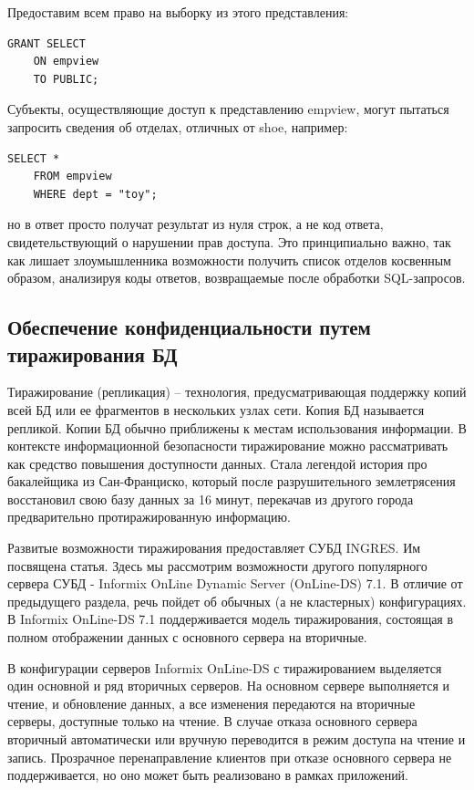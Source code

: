 Предоставим всем право на выборку из этого представления:
\begin{lstlisting}[]
    GRANT SELECT
    ON empview
    TO PUBLIC;
\end{lstlisting}

Субъекты, осуществляющие доступ к представлению empview, могут пытаться запросить сведения об
отделах, отличных от shoe, например:
\begin{lstlisting}[]
    SELECT *
    FROM empview
    WHERE dept = "toy";
\end{lstlisting}

но в ответ просто получат результат из нуля строк, а не код ответа, свидетельствующий о нарушении
прав доступа. Это принципиально важно, так как лишает злоумышленника возможности получить список
отделов косвенным образом, анализируя коды ответов, возвращаемые после обработки SQL-запросов.


\subsection{Обеспечение конфиденциальности путем тиражирования БД}

Тиражирование (репликация) – технология, предусматривающая поддержку
копий всей БД или ее фрагментов в нескольких узлах сети. Копия БД называется
репликой. Копии БД обычно приближены к местам использования информации.
В контексте информационной безопасности тиражирование можно рассматривать как средство повышения
доступности данных. Стала легендой история про бакалейщика из Сан-Франциско, который после
разрушительного землетрясения восстановил свою базу данных за 16 минут, перекачав из другого
города предварительно протиражированную информацию.

Развитые возможности тиражирования предоставляет СУБД INGRES.
Им посвящена статья\cite{BeynonDavies}. Здесь мы рассмотрим возможности другого популярного сервера
СУБД - Informix OnLine Dynamic Server (OnLine-DS) 7.1. В отличие от предыдущего раздела, речь
пойдет об обычных (а не кластерных) конфигурациях.
В Informix OnLine-DS 7.1 поддерживается модель тиражирования, состоящая в полном отображении данных
с основного сервера на вторичные.

В конфигурации серверов Informix OnLine-DS с тиражированием выделяется один основной и ряд
вторичных серверов. На основном сервере выполняется и чтение, и обновление данных, а все изменения
передаются на вторичные серверы, доступные только на чтение. В случае отказа основного сервера
вторичный автоматически или вручную переводится в режим доступа на чтение и запись. Прозрачное
перенаправление клиентов при отказе основного сервера не поддерживается, но оно может быть
реализовано в рамках приложений.

